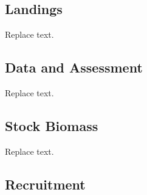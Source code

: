 \documentclass[11pt,
  english,
  a4paper,
]{article}
\begin{document}
\leavevmode\tagmcend\tagstructend\par


\hypertarget{landings}{%
\subsection*{Landings}\label{landings}}

\leavevmode\tagmcend\tagstructend


Replace text.

\leavevmode\tagmcend\tagstructend\par


\hypertarget{data-and-assessment}{%
\subsection*{Data and Assessment}\label{data-and-assessment}}

\leavevmode\tagmcend\tagstructend


Replace text.

\leavevmode\tagmcend\tagstructend\par


\hypertarget{stock-biomass}{%
\subsection*{Stock Biomass}\label{stock-biomass}}

\leavevmode\tagmcend\tagstructend


Replace text.

\leavevmode\tagmcend\tagstructend\par


\hypertarget{recruitment}{%
\subsection*{Recruitment}\label{recruitment}}
\end{document}
